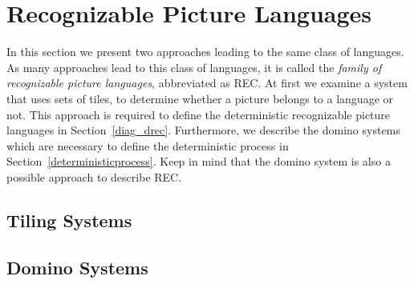 \section{Recognizable Picture Languages}
In this section we present two approaches leading to the same class of languages. As many
approaches lead to this class of languages, it is called the
\emph{family of recognizable picture languages}, abbreviated as REC. At first we examine a system
that uses sets of tiles, to determine whether a picture belongs to a language or not. This approach
is required to define the deterministic recognizable picture languages in Section~\ref{diag_drec}.
Furthermore, we describe the domino systems which are necessary to define the deterministic process
in Section~\ref{deterministicprocess}. Keep in mind that the domino system is also a possible
approach to describe REC.
\subsection{Tiling Systems}



\subsection{Domino Systems}


\label{section:domino_systems}